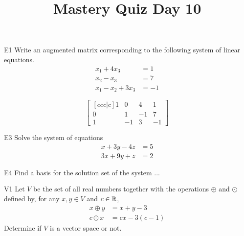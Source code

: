 \documentclass{sbgLAquiz}
\title{Mastery Quiz Day 10 }
\begin{document}
\begin{problem}{E1}
Write an augmented matrix corresponding to the following system of linear equations.
\begin{align*}
x_1+4x_3 &= 1 \\
x_2-x_3 &= 7 \\
x_1-x_2+3x_3 &= -1
\end{align*}
\end{problem}
\begin{solution}
$$\begin{bmatrix}[ccc|c]
1 & 0 & 4 & 1 \\
0 & 1 & -1 & 7 \\
1 & -1 & 3 & -1
\end{bmatrix}$$
\end{solution}

\begin{problem}{E3}
Solve the system of equations
\begin{align*}
x+3y-4z &= 5 \\
3x+9y+z &= 2
\end{align*}
\end{problem}

\begin{extract}\newpage\end{extract}
\begin{problem}{E4}
Find a basis for the solution set of the system ...
\end{problem}
\begin{problem}{V1}
Let $V$ be the  set of all real numbers together with the operations $\oplus$ and $\odot$ defined by, for any $x,y \in V$ and $c \in \mathbb{R}$,
\begin{align*}
x\oplus y  &= x+y-3 \\
c \odot x &= cx-3(c-1)
\end{align*}
Determine if $V$ is a vector space or not.
\end{problem}
\end{document}
